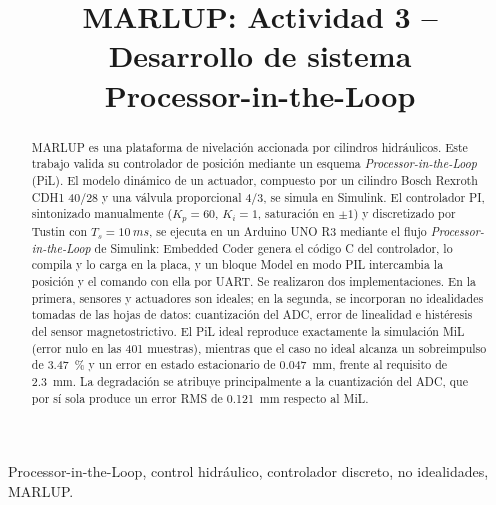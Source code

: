 \documentclass[conference]{IEEEtran}
\begin{document}
\title{MARLUP: Actividad 3 -- Desarrollo de sistema\\Processor-in-the-Loop}

\author{
}

\maketitle

\begin{abstract}
MARLUP es una plataforma de nivelación accionada por cilindros hidráulicos. Este trabajo valida su controlador de posición mediante un esquema \textit{Processor-in-the-Loop} (PiL). El modelo dinámico de un actuador, compuesto por un cilindro Bosch Rexroth CDH1 40/28 y una válvula proporcional 4/3, se simula en Simulink. El controlador PI, sintonizado manualmente ($K_p=60$, $K_i=1$, saturación en $\pm1$) y discretizado por Tustin con $T_s=\SI{10}{ms}$, se ejecuta en un Arduino UNO R3 mediante el flujo \textit{Processor-in-the-Loop} de Simulink: Embedded Coder genera el código C del controlador, lo compila y lo carga en la placa, y un bloque Model en modo PIL intercambia la posición y el comando con ella por UART. Se realizaron dos implementaciones. En la primera, sensores y actuadores son ideales; en la segunda, se incorporan no idealidades tomadas de las hojas de datos: cuantización del ADC, error de linealidad e histéresis del sensor magnetostrictivo. El PiL ideal reproduce exactamente la simulación MiL (error nulo en las 401 muestras), mientras que el caso no ideal alcanza un sobreimpulso de \SI{3.47}{\percent} y un error en estado estacionario de \SI{0.047}{mm}, frente al requisito de \SI{2.3}{mm}. La degradación se atribuye principalmente a la cuantización del ADC, que por sí sola produce un error RMS de \SI{0.121}{mm} respecto al MiL.
\end{abstract}

\begin{IEEEkeywords}
Processor-in-the-Loop, control hidráulico, controlador discreto, no idealidades, MARLUP.
\end{IEEEkeywords}

\end{document}
